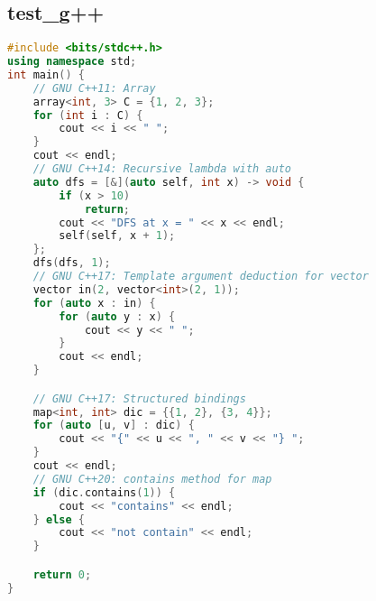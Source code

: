 \subsection{test\_g++}
\begin{lstlisting}[language=C++]
#include <bits/stdc++.h>
using namespace std;
int main() {
    // GNU C++11: Array
    array<int, 3> C = {1, 2, 3};
    for (int i : C) {
        cout << i << " ";
    }
    cout << endl;
    // GNU C++14: Recursive lambda with auto
    auto dfs = [&](auto self, int x) -> void {
        if (x > 10)
            return;
        cout << "DFS at x = " << x << endl;
        self(self, x + 1);
    };
    dfs(dfs, 1);
    // GNU C++17: Template argument deduction for vector
    vector in(2, vector<int>(2, 1));
    for (auto x : in) {
        for (auto y : x) {
            cout << y << " ";
        }
        cout << endl;
    }

    // GNU C++17: Structured bindings
    map<int, int> dic = {{1, 2}, {3, 4}};
    for (auto [u, v] : dic) {
        cout << "{" << u << ", " << v << "} ";
    }
    cout << endl;
    // GNU C++20: contains method for map
    if (dic.contains(1)) {
        cout << "contains" << endl;
    } else {
        cout << "not contain" << endl;
    }

    return 0;
}

\end{lstlisting}
